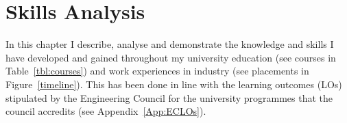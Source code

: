\chapter{Skills Analysis} %

\label{Chapter3} %


In this chapter I describe, analyse and demonstrate the knowledge and skills I have developed and gained throughout my university education
(see courses in Table~\ref{tbl:courses})
and work experiences in industry
(see placements in Figure~\ref{timeline}).
This has been done in line with the learning outcomes (LOs) stipulated by the Engineering Council for the university programmes that the council accredits (see Appendix~\ref{App:ECLOs}).



